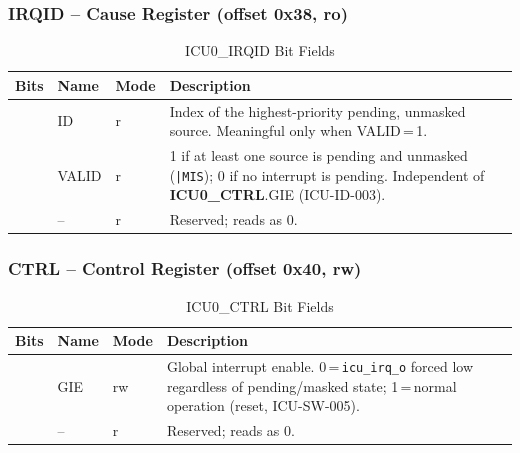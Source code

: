 \subsubsection{IRQID -- Cause Register (offset 0x38, ro)}

\begin{table}[H]
\caption{ICU0\_IRQID Bit Fields}
\label{tab:asIcuIRQID}
\centering
\begin{tabularx}{\textwidth}{|l |l |l |X|}
  \hline
  Bits & Name & Mode & Description \\
  \hline
  \hline
  [2:0]  & ID    & r & Index of the highest-priority pending, unmasked
    source. Meaningful only when VALID\,=\,1. \\
  \hline
  [3]    & VALID & r & 1 if at least one source is pending and unmasked
    (\texttt{|MIS}); 0 if no interrupt is pending. Independent of
    \textbf{ICU0\_CTRL}.GIE (ICU-ID-003). \\
  \hline
  [63:4] & --    & r & Reserved; reads as 0. \\
  \hline
\end{tabularx}
\end{table}

\subsubsection{CTRL -- Control Register (offset 0x40, rw)}

\begin{table}[H]
\caption{ICU0\_CTRL Bit Fields}
\label{tab:asIcuCTRL}
\centering
\begin{tabularx}{\textwidth}{|l |l |l |X|}
  \hline
  Bits & Name & Mode & Description \\
  \hline
  \hline
  [0]    & GIE & rw & Global interrupt enable. 0\,=\,\texttt{icu\_irq\_o}
    forced low regardless of pending/masked state; 1\,=\,normal operation
    (reset, ICU-SW-005). \\
  \hline
  [63:1] & --  & r  & Reserved; reads as 0. \\
  \hline
\end{tabularx}
\end{table}
